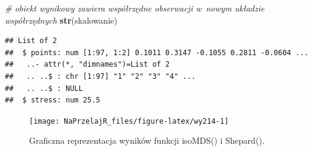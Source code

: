 \documentclass[polish,]{book}
\newenvironment{Shaded}{\begin{snugshade}}{\end{snugshade}}
\newcommand{\CommentTok}[1]{\textcolor[rgb]{0.56,0.35,0.01}{\textit{#1}}}
\newcommand{\DataTypeTok}[1]{\textcolor[rgb]{0.13,0.29,0.53}{#1}}
\newcommand{\DecValTok}[1]{\textcolor[rgb]{0.00,0.00,0.81}{#1}}
\newcommand{\FloatTok}[1]{\textcolor[rgb]{0.00,0.00,0.81}{#1}}
\newcommand{\KeywordTok}[1]{\textcolor[rgb]{0.13,0.29,0.53}{\textbf{#1}}}
\newcommand{\NormalTok}[1]{#1}
\newcommand{\OperatorTok}[1]{\textcolor[rgb]{0.81,0.36,0.00}{\textbf{#1}}}
\newcommand{\StringTok}[1]{\textcolor[rgb]{0.31,0.60,0.02}{#1}}
\begin{document}
\begin{Shaded}
\begin{Highlighting}[]
\CommentTok{# obiekt wynikowy zawiera współrzędne obserwacji w~nowym układzie współrzędnych}
\KeywordTok{str}\NormalTok{(skalowanie)}
\end{Highlighting}
\end{Shaded}

\begin{verbatim}
## List of 2
##  $ points: num [1:97, 1:2] 0.1011 0.3147 -0.1055 0.2811 -0.0604 ...
##   ..- attr(*, "dimnames")=List of 2
##   .. ..$ : chr [1:97] "1" "2" "3" "4" ...
##   .. ..$ : NULL
##  $ stress: num 25.5
\end{verbatim}

\begin{Shaded}
\end{Shaded}

\begin{Shaded}
\end{Shaded}

\begin{figure}[h]

{\centering \texttt{[image: NaPrzelajR\_files/figure-latex/wy214-1]} 

}

\caption{Graficzna reprezentacja wyników funkcji isoMDS() i Shepard().}\label{fig:wy214}
\end{figure}
\end{document}
